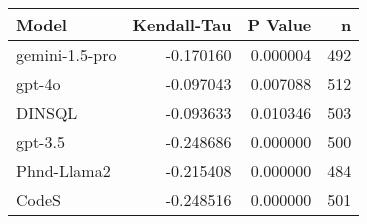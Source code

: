 \begin{tabular}{lrrr}
\toprule
Model & Kendall-Tau & P Value & n \\
\midrule
gemini-1.5-pro & -0.170160 & 0.000004 & 492 \\
gpt-4o & -0.097043 & 0.007088 & 512 \\
DINSQL & -0.093633 & 0.010346 & 503 \\
gpt-3.5 & -0.248686 & 0.000000 & 500 \\
Phnd-Llama2 & -0.215408 & 0.000000 & 484 \\
CodeS & -0.248516 & 0.000000 & 501 \\
\bottomrule
\end{tabular}
